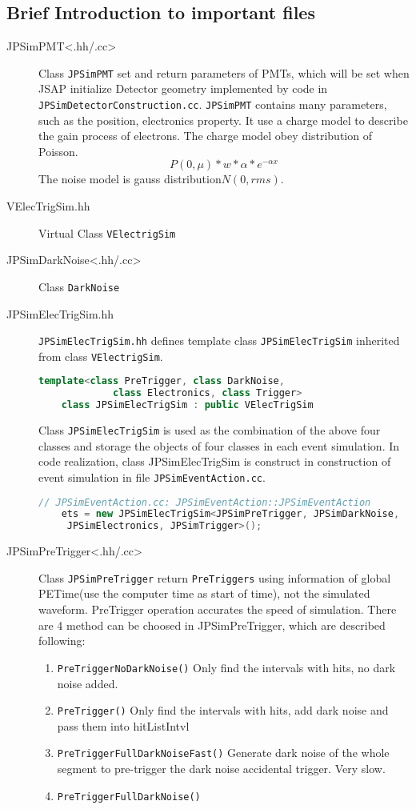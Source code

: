 \subsection{Brief Introduction to important files}
\begin{description}
    \item[JPSimPMT<.hh/.cc>] Class \texttt{JPSimPMT} set and return parameters of PMTs, 
    which will be set when JSAP initialize Detector geometry implemented by code in \texttt{JPSimDetectorConstruction.cc}.
    \texttt{JPSimPMT} contains many parameters, such as the position, electronics property. It use a charge model to describe
    the gain process of electrons. The charge model obey distribution of Poisson.
    \[P(0, \mu)*w*\alpha*e^{-\alpha x}\]
    The noise model is gauss distribution$N(0, rms)$.
    \item[VElecTrigSim.hh] Virtual Class \texttt{VElectrigSim}
    \item[JPSimDarkNoise<.hh/.cc>]  Class \texttt{DarkNoise}
    \item[JPSimElecTrigSim.hh]\label{JPSimElecTrigSim} \texttt{JPSimElecTrigSim.hh} defines template class \texttt{JPSimElecTrigSim} inherited from class \texttt{VElectrigSim}.
    \begin{lstlisting}[language=C++]
    template<class PreTrigger, class DarkNoise,
             class Electronics, class Trigger>
    class JPSimElecTrigSim : public VElecTrigSim
    \end{lstlisting}
    Class \texttt{JPSimElecTrigSim} is used as the combination of the above four classes and storage the objects of four classes in each event simulation. In code realization, class JPSimElecTrigSim
    is construct in construction of event simulation in file \texttt{JPSimEventAction.cc}. 
    \begin{lstlisting}[language=C++]
    // JPSimEventAction.cc: JPSimEventAction::JPSimEventAction
    ets = new JPSimElecTrigSim<JPSimPreTrigger, JPSimDarkNoise,
     JPSimElectronics, JPSimTrigger>();
    \end{lstlisting}
    \item[JPSimPreTrigger<.hh/.cc>] Class \texttt{JPSimPreTrigger} return \texttt{PreTriggers} using information of global PETime(use the computer time as start of time), not the simulated waveform.
    PreTrigger operation accurates the speed of simulation. There are 4 method can be choosed
    in JPSimPreTrigger, which are described following:
    \begin{enumerate}
        \item \texttt{PreTriggerNoDarkNoise()} Only find the intervals with hits, no dark noise added.
        \item \texttt{PreTrigger()} Only find the intervals with hits, add dark noise and pass them into hitListIntvl
        \item \texttt{PreTriggerFullDarkNoiseFast()} Generate dark noise of the whole segment to pre-trigger the dark noise accidental trigger. Very slow.
        \item \texttt{PreTriggerFullDarkNoise()}
    \end{enumerate}


\end{description}
